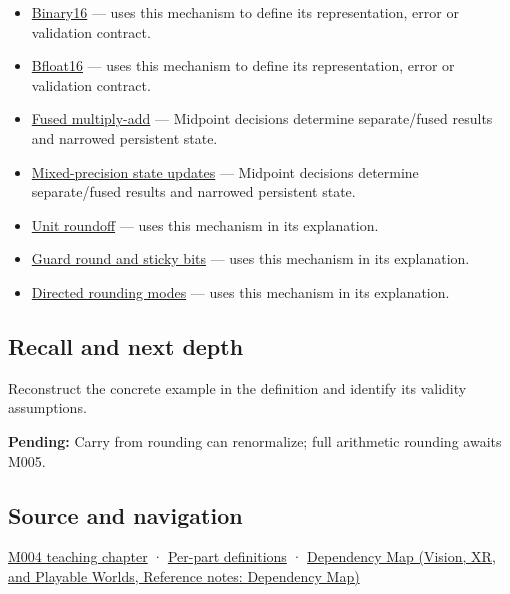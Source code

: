 \begin{itemize}
\item
  \hyperref[appendix-34443cec7170]{Binary16} --- uses this mechanism to define its representation, error or validation contract.
\item
  \hyperref[appendix-18b8dd966b5d]{Bfloat16} --- uses this mechanism to define its representation, error or validation contract.
\item
  \hyperref[appendix-41e8ef22a21e]{Fused multiply-add} --- Midpoint decisions determine separate/fused results and narrowed persistent state.
\item
  \hyperref[appendix-260182e617b7]{Mixed-precision state updates} --- Midpoint decisions determine separate/fused results and narrowed persistent state.
\item
  \hyperref[appendix-bc44f7b42f42]{Unit roundoff} --- uses this mechanism in its explanation.
\item
  \hyperref[appendix-b572b631069b]{Guard round and sticky bits} --- uses this mechanism in its explanation.
\item
  \hyperref[appendix-637d164ae5ca]{Directed rounding modes} --- uses this mechanism in its explanation.
\end{itemize}

\subsection{Recall and next depth}\label{appendix-614afe1de592-recall-and-next-depth}

Reconstruct the concrete example in the definition and identify its validity assumptions.

\textbf{Pending:} Carry from rounding can renormalize; full arithmetic rounding awaits M005.

\subsection{Source and navigation}\label{appendix-614afe1de592-source-and-navigation}

\hyperref[01-foundations-i-ch001-a-stretching-ruler-for-real-valued-quantities]{M004 teaching chapter} · \hyperref[appendix-fd090d982a15-m004---parts-61-76]{Per-part definitions} · \href{../07-Vision-XR-and-Playable-Worlds/main.pdf\#nameddest=appendix-4ad47bdd269a}{Dependency Map (Vision, XR, and Playable Worlds, Reference notes: Dependency Map)}
